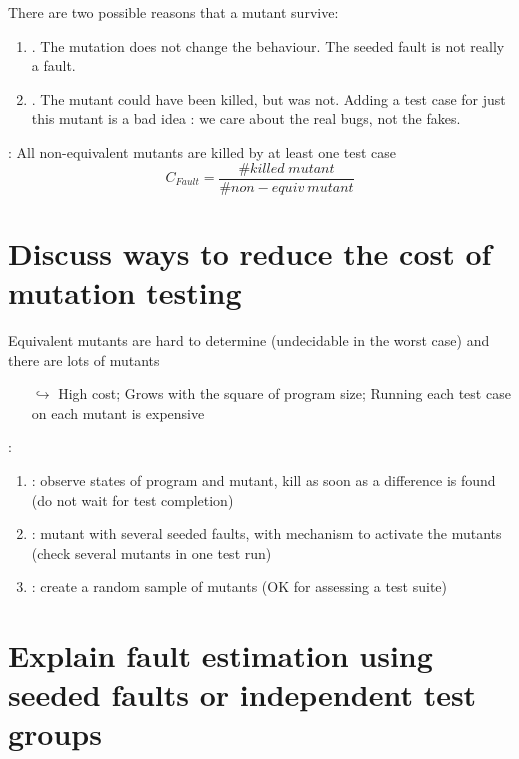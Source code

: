 There are two possible reasons that a mutant survive:
\begin{enumerate}
    \item {}. The mutation does not change the behaviour. The seeded fault is not really a fault.
    \item {}. The mutant could have been killed, but was not. Adding a test case for just this mutant is a bad idea : we care about the real bugs, not the fakes.
\end{enumerate}

\noindent {} : All non-equivalent mutants are killed by at least one test case
$$C_{Fault} = \frac{\#killed\;mutant}{\#non-equiv\ mutant}$$

\section{Discuss ways to reduce the cost of mutation testing}

Equivalent mutants are hard to determine (undecidable in the worst case) and there are lots of mutants
\begin{itemize}
    \item[$\hookrightarrow$] High cost; Grows with the square of program size; Running each test case on each mutant is expensive
\end{itemize}

 : 
\begin{enumerate}
    \item {} : observe states of program and mutant, kill as soon as a difference is found (do not wait for test completion)
    \item {} : mutant with several seeded faults, with mechanism to activate the mutants (check several mutants in one test run)
    \item {} : create a random sample of mutants (OK for assessing a test suite)
\end{enumerate}

\section{Explain fault estimation using seeded faults or independent test groups}

